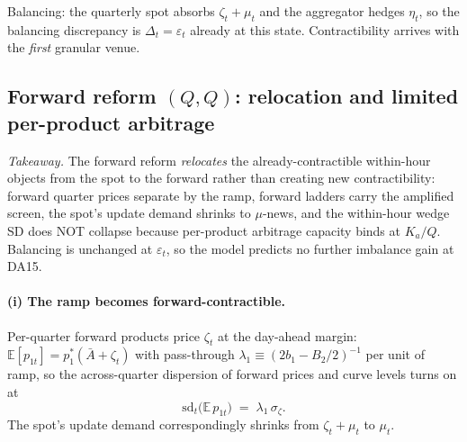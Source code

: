 \documentclass[11pt,a4paper]{article}
\theoremstyle{definition}
\theoremstyle{remark}
\theoremstyle{plain}
\begin{document}
Balancing: the quarterly spot absorbs $\zeta_t + \mu_t$ and the aggregator hedges $\eta_t$, so the balancing discrepancy is $\Delta_t = \varepsilon_t$ already at this state. Contractibility arrives with the \emph{first} granular venue.

\subsection{Forward reform $(Q,Q)$: relocation and limited per-product arbitrage}\label{sec:da15}

\emph{Takeaway.} The forward reform \emph{relocates} the already-contractible within-hour objects from the spot to the forward rather than creating new contractibility: forward quarter prices separate by the ramp, forward ladders carry the amplified screen, the spot's update demand shrinks to $\mu$-news, and the within-hour wedge SD does NOT collapse because per-product arbitrage capacity binds at $K_a/Q$. Balancing is unchanged at $\varepsilon_t$, so the model predicts no further imbalance gain at DA15.

\paragraph{(i) The ramp becomes forward-contractible.} Per-quarter forward products price $\zeta_t$ at the day-ahead margin: $\mathbb{E}[p_{1t}] = p_1^*(\bar A + \zeta_t)$ with pass-through $\lambda_1 \equiv (2 b_1 - B_2/2)^{-1}$ per unit of ramp, so the across-quarter dispersion of forward prices and curve levels turns on at
\[
\mathrm{sd}_t\bigl(\mathbb{E}\,p_{1t}\bigr) \;=\; \lambda_1\, \sigma_\zeta.
\]
The spot's update demand correspondingly shrinks from $\zeta_t + \mu_t$ to $\mu_t$.
\end{document}
